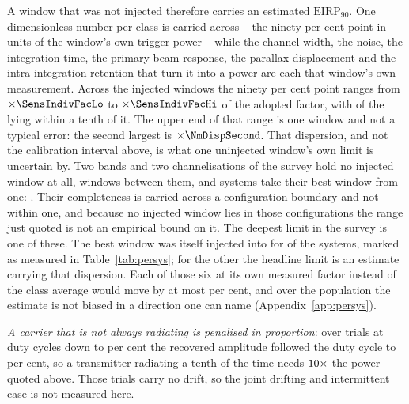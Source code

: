 A window that was not injected therefore carries an estimated
$\mathrm{EIRP}_{90}$. One dimensionless number per class is
carried across -- the ninety per cent point in units of the window's own trigger power
-- while the channel width, the noise, the integration time, the primary-beam
response, the parallax displacement and the intra-integration retention that
turn it into a power are each that window's own measurement.
Across the injected windows the ninety per cent point
ranges from $\times\SensIndivFacLo$ to $\times\SensIndivFacHi$ of the
adopted factor, with \NmDispNTenth{} of the \SensNInj{} lying within a tenth
of it. The upper end of that range is one window and not a typical error: the
second largest is $\times\NmDispSecond$. That dispersion, and not the calibration
interval above, is what one uninjected window's own limit is uncertain by.
Two bands and two channelisations of the survey hold no injected window at
all, \NgNExtrapWin{} windows between them, and \NgNExtrapSys{} systems take
their best window from one: \NgExtrapSys. Their completeness is carried
across a configuration boundary and not within one, and because no
injected window lies in those configurations the range just quoted is not an
empirical bound on it. The deepest limit in the survey is one of these.
The best window was itself injected into for \SmcNMeasSys{} of the
\NSysClassA{} systems, marked as measured in Table~\ref{tab:persys}; for the
other \SmcNEstSys{} the headline limit is an estimate carrying that
dispersion. Each of those six at its own measured
factor instead of the class average would move by at most \NmOwnDevPct{} per
cent, and over the population the estimate is not biased in a direction one
can name (Appendix~\ref{app:persys}).

\emph{A carrier that is not always radiating is penalised in proportion}: over
\DutyNTrial{} trials at duty cycles down to \DutyCycleMinPct{} per cent the
recovered amplitude followed the duty cycle to \DutyAttenDevPct{} per cent, so
a transmitter radiating a tenth of the time needs $10\times$ the
power quoted above. Those trials carry no drift, so the joint drifting and
intermittent case is not measured here.

\begin{table}
\centering
\scriptsize
\caption{What sets $\mathrm{EIRP}_{90}$, and in which direction. The
calibration interval applies to the class-average factor and so to any
statistic over many windows; the spread between windows is an observed
dispersion and is the statement about one window; the signed terms are biases
and are not folded into an error bar (\S\ref{sec:pninetysel}).}
\label{tab:p90budget}
\setlength{\tabcolsep}{2pt}

\end{table}

